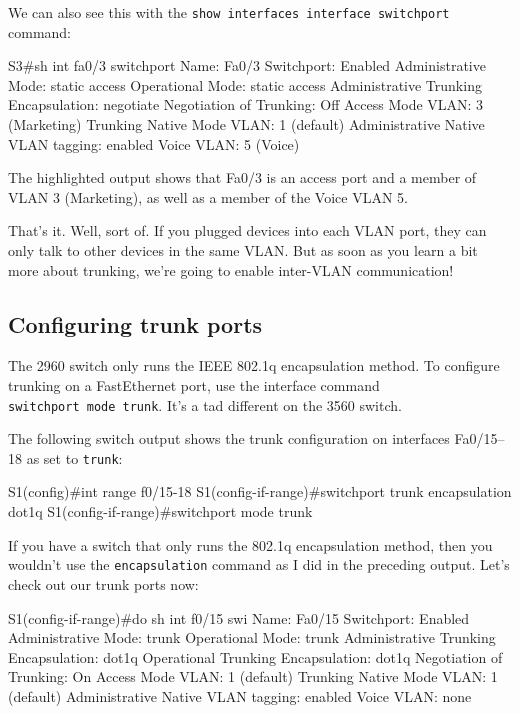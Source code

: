 \documentclass[b5paper,11pt]{memoir}
\begin{document}
We can also see this with the
\texttt{show\ interfaces\ interface\ switchport} command:

\begin{cli}
S3#sh int fa0/3 switchport
Name: Fa0/3
Switchport: Enabled
Administrative Mode: static access
Operational Mode: static access
Administrative Trunking Encapsulation: negotiate
Negotiation of Trunking: Off
Access Mode VLAN: 3 (Marketing)
Trunking Native Mode VLAN: 1 (default)
Administrative Native VLAN tagging: enabled
Voice VLAN: 5 (Voice)
\end{cli}

The highlighted output shows that Fa0/3 is an access port and a member
of VLAN 3 (Marketing), as well as a member of the Voice VLAN 5.

That's it. Well, sort of. If you plugged devices into each VLAN port,
they can only talk to other devices in the same VLAN. But as soon as you
learn a bit more about trunking, we're going to enable inter-VLAN
communication!



\subsection{Configuring trunk ports}

The 2960 switch only runs the IEEE 802.1q encapsulation method. To
configure trunking on a FastEthernet port, use the interface command
\texttt{switchport\ mode\ trunk}. It's a tad diff­erent on the 3560
switch.

The following switch output shows the trunk configuration on interfaces
Fa0/15--18 as set to \texttt{trunk}:

\begin{cli}
S1(config)#int range f0/15-18
S1(config-if-range)#switchport trunk encapsulation dot1q
S1(config-if-range)#switchport mode trunk
\end{cli}

If you have a switch that only runs the 802.1q encapsulation method,
then you wouldn't use the \texttt{encapsulation} command as I did in the
preceding output. Let's check out our trunk ports now:

\begin{cli}
S1(config-if-range)#do sh int f0/15 swi
Name: Fa0/15
Switchport: Enabled
Administrative Mode: trunk
Operational Mode: trunk
Administrative Trunking Encapsulation: dot1q
Operational Trunking Encapsulation: dot1q
Negotiation of Trunking: On
Access Mode VLAN: 1 (default)
Trunking Native Mode VLAN: 1 (default)
Administrative Native VLAN tagging: enabled
Voice VLAN: none
\end{cli}
\end{document}

